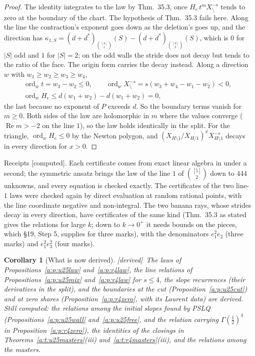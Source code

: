 \documentclass[11pt]{article}
\DeclareMathOperator{\re}{Re}
\theoremstyle{plain}
\newtheorem{corollary}[proposition]{Corollary}
\theoremstyle{definition}
\theoremstyle{remark}
\newcommand{\derived}{\textup{[derived]}}
\newcommand{\computed}{\textup{[computed]}}
\begin{document}
\begin{proof}
The identity integrates to the law by Thm.~35.3, once $H_e\,t^m X_{\setminus}^{-s}$ tends to zero at the boundary of the chart. The hypothesis of Thm.~35.3 fails here. Along the line the contraction's exponent goes down as the deletion's goes up, and the direction has $\kappa_{1,S}=(d+d^\ast)_{\binom{[4]}1}(S)-(d+d^\ast)_{\binom{[4]}2}(S)$, which is $0$ for $|S|$ odd and $1$ for $|S|=2$; on the odd walls the stride does not decay but tends to the ratio of the face. The origin form carries the decay instead. Along a direction $w$ with $w_1\ge w_2\ge w_3\ge w_4$,
\begin{gather*}
\operatorname{ord}_wt=w_3-w_2\le0,\qquad \operatorname{ord}_wX_{\setminus}^{-s}=s(w_3+w_4-w_1-w_2)<0,\\
\operatorname{ord}_wH_e\le d(w_1+w_2)-d(w_1+w_2)=0,
\end{gather*}
the last because no exponent of $P$ exceeds $d$. So the boundary terms vanish for $m\ge0$. Both sides of the law are holomorphic in $m$ where the values converge ($\re m>-2$ on the line $1$), so the law holds identically in the split. For the triangle, $\operatorname{ord}_wH_e\le0$ by the Newton polygon, and $(X_{H\setminus1}/X_{H/1})^xX_{H\setminus1}^{-s}$ decays in every direction for $x>0$.
\end{proof}

\noindent Receipts \computed. Each certificate comes from exact linear algebra in under a second; the symmetric ansatz brings the law of the line $1$ of $\binom{[5]}2$ down to $444$ unknowns, and every equation is checked exactly. The certificates of the two line-$1$ laws were checked again by direct evaluation at random rational points, with the line coordinate negative and non-integral. The two banana rays, whose strides decay in every direction, have certificates of the same kind (Thm.~35.3 as stated gives the relations for large $k$; down to $k\to0^+$ it needs bounds on the pieces, which \S19, Step 5, supplies for three marks), with the denominators $e_1^2e_2$ (three marks) and $e_1^2e_3^2$ (four marks).

\begin{corollary}[What is now derived]\label{a:c:certs}\derived\
The laws of Propositions~\ref{a:p:u25law} and~\ref{a:p:r4law}, the line relations of Propositions~\ref{a:p:u25mix} and~\ref{a:p:r4law} for $s\le4$, the slope recurrences (their derivatives in the split), and the boundaries at the cut (Proposition~\ref{a:p:u25cut}) and at zero shares (Proposition~\ref{a:p:r4zero}, with its Laurent data) are derived. Still computed: the relations among the initial slopes found by PSLQ (Propositions~\ref{a:p:u25wall} and~\ref{a:p:u25free}, and the relation carrying $\Gamma(\frac12)^4$ in Proposition~\ref{a:p:r4zero}), the identities of the closings in Theorems~\ref{a:t:u25masters}(iii) and~\ref{a:t:r4masters}(iii), and the relations among the masters.
\end{corollary}
\end{document}
